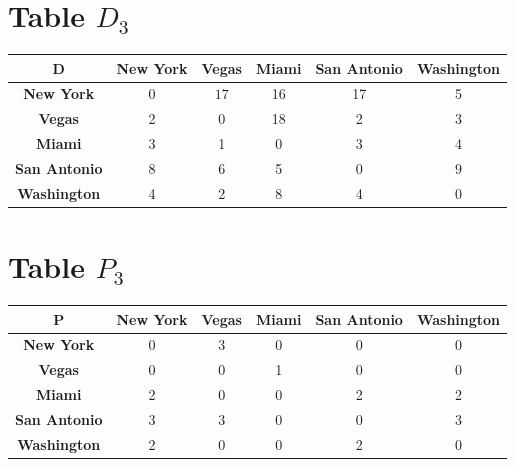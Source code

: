 \documentclass{article}
\begin{document}
\section{Table $D_{3}$}
\begin{center}
    \begin{tabular}{|c||c|c|c|c|c|}
        \hline
        \textbf{D} & \textbf{New York} & \textbf{Vegas} & \textbf{Miami} & \textbf{San Antonio} & \textbf{Washington} \\
        \hline
        \hline
        \textbf{New York}& 0 & \cellcolor[HTML]{D74894}$17$ & 16 & 17 & 5 \\
        \hline
        \textbf{Vegas}& 2 & 0 & 18 & 2 & 3 \\
        \hline
        \textbf{Miami}& 3 & 1 & 0 & 3 & 4 \\
        \hline
        \textbf{San Antonio}& \cellcolor[HTML]{D74894}$8$ & \cellcolor[HTML]{D74894}$6$ & 5 & 0 & \cellcolor[HTML]{D74894}$9$ \\
        \hline
        \textbf{Washington}& 4 & 2 & 8 & 4 & 0 \\
        \hline
    \end{tabular}
\end{center}


\section{Table $P_{3}$}
\begin{center}
    \begin{tabular}{|c||c|c|c|c|c|}
        \hline
        \textbf{P} & \textbf{New York} & \textbf{Vegas} & \textbf{Miami} & \textbf{San Antonio} & \textbf{Washington} \\
        \hline
        \hline
        \textbf{New York}& 0 & \cellcolor[HTML]{D74894}$3$ & 0 & 0 & 0 \\
        \hline
        \textbf{Vegas}& 0 & 0 & 1 & 0 & 0 \\
        \hline
        \textbf{Miami}& 2 & 0 & 0 & 2 & 2 \\
        \hline
        \textbf{San Antonio}& \cellcolor[HTML]{D74894}$3$ & \cellcolor[HTML]{D74894}$3$ & 0 & 0 & \cellcolor[HTML]{D74894}$3$ \\
        \hline
        \textbf{Washington}& 2 & 0 & 0 & 2 & 0 \\
        \hline
    \end{tabular}
\end{center}
\end{document}
